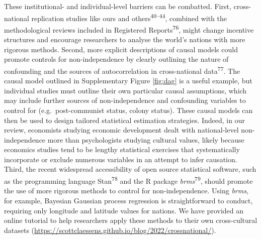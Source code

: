 \documentclass[
  man,floatsintext]{apa6}
\begin{document}
These institutional- and individual-level barriers can be combatted. First, cross-national replication studies like ours and others\textsuperscript{40--44}, combined with the methodological reviews included in Registered Reports\textsuperscript{76}, might change incentive structures and encourage researchers to analyse the world's nations with more rigorous methods. Second, more explicit descriptions of causal models could promote controls for non-independence by clearly outlining the nature of confounding and the sources of autocorrelation in cross-national data\textsuperscript{77}. The causal model outlined in Supplementary Figure \ref{fig:dag} is a useful example, but individual studies must outline their own particular causal assumptions, which may include further sources of non-independence and confounding variables to control for (e.g.~post-communist status, colony status). These causal models can then be used to design tailored statistical estimation strategies. Indeed, in our review, economists studying economic development dealt with national-level non-independence more than psychologists studying cultural values, likely because economics studies tend to be lengthy statistical exercises that systematically incorporate or exclude numerous variables in an attempt to infer causation. Third, the recent widespread accessibility of open source statistical software, such as the programming language Stan\textsuperscript{78} and the R package \emph{brms}\textsuperscript{79}, should promote the use of more rigorous methods to control for non-independence. Using \emph{brms}, for example, Bayesian Gaussian process regression is straightforward to conduct, requiring only longitude and latitude values for nations. We have provided an online tutorial to help researchers apply these methods to their own cross-cultural datasets (\url{https://scottclaessens.github.io/blog/2022/crossnational/}).
\end{document}
